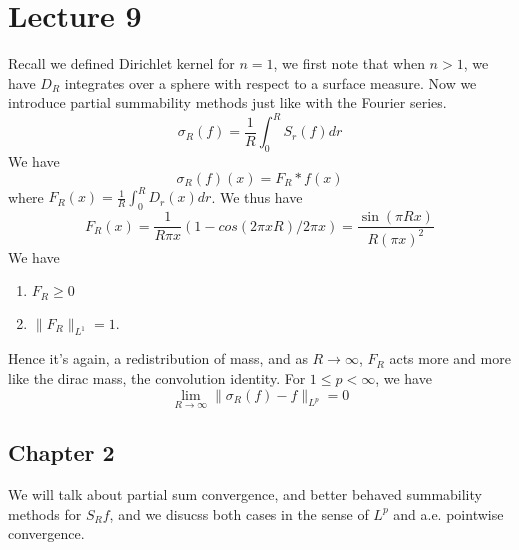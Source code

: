 \section{Lecture 9}
Recall we defined Dirichlet kernel for $n=1$, we first note that when $n>1$, we have $D_R$ integrates over a sphere with respect to a surface measure. Now we introduce partial summability methods just like with the Fourier series.
\begin{equation*}
    \sigma_R(f)=\frac{1}{R}\int_0^R S_r(f)dr
\end{equation*}
We have
\begin{equation*}
    \sigma_R(f)(x)=F_R\ast f(x)
\end{equation*}
where $F_R(x)=\frac{1}{R}\int_0^RD_r(x)dr$. 
We thus have
\begin{equation*}
    F_R(x)=\frac{1}{R\pi x}(1-cos(2\pi xR)/2\pi x)=\frac{\sin(\pi Rx)}{R(\pi x)^2}
\end{equation*}
We have
\begin{enumerate}
    \item $F_R\geq 0$
    \item $\|F_R\|_{L^1}=1$.
\end{enumerate}
Hence it's again, a redistribution of mass, and as $R\to\infty$, $F_R$ acts more and more like the dirac mass, the convolution identity. For $1\leq p<\infty$, we have
\begin{equation*}
    \lim_{R\to\infty}\|\sigma_R(f)-f\|_{L^p}=0
\end{equation*}

\subsection{Chapter 2}
We will talk about partial sum convergence, and better behaved summability methods for $S_Rf$, and we disucss both cases in the sense of $L^p$ and a.e. pointwise convergence.

